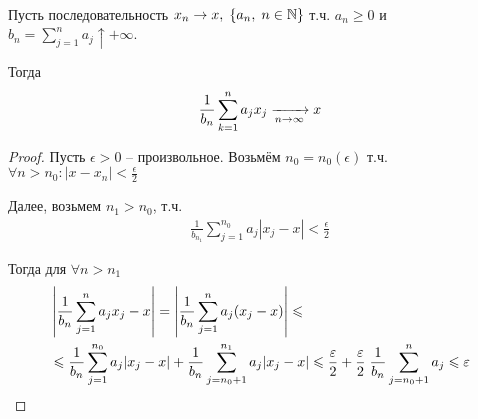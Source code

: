 \begin{lemma}[Тёплиц]~

  Пусть последовательность $x_n \to x,\; \{a_n,\; n \in \mathbb{N}\}$ т.ч. $a_n \geq 0$ и 
  $b_n = \sum\limits_{j = 1}^{n} a_j \uparrow +\infty$.

  Тогда 
  \begin{align*}
    \frac{1}{b_n} \sum\limits_{k = 1}^{n} a_j x_j \xrightarrow[n \to \infty]{} x
  \end{align*}
  
  \begin{proof}
    Пусть $\epsilon > 0$ -- произвольное. Возьмём $n_0 = n_0(\epsilon)$ т.ч. 
    $\forall n > n_0: |x - x_n| < \frac{\epsilon}{2}$

    Далее, возьмем $n_1 > n_0$, т.ч. 
    \begin{align*}
      \frac{1}{b_{n_1}} \sum_{j = 1}^{n_0} a_j |x_j - x| < \frac{\epsilon}{2}
    \end{align*}

    Тогда для $\forall n > n_1$
    \begin{align*}
      &\left | \frac{1}{b_n} \sum_{j = 1}^{n} a_j x_j - x \right | = 
      \left | \frac{1}{b_n} \sum_{j = 1}^{n} a_j (x_j - x) \right | \leqslant \\
      &\leqslant \frac{1}{b_n} \sum_{j = 1}^{n_0} a_j |x_j - x| + 
      \frac{1}{b_n} \sum_{j = n_0 + 1}^{n_1} a_j |x_j - x| \leqslant 
      \frac{\varepsilon}{2} + \frac{\varepsilon}{2}\; \frac{1}{b_n} \sum_{j = n_0 + 1}^{n} a_j 
      \leqslant \varepsilon
    \end{align*}
  \end{proof}

\end{lemma}

